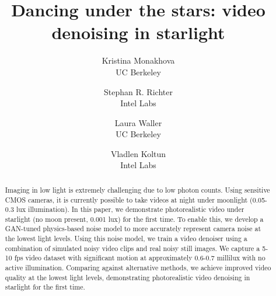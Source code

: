 \documentclass[final]{cvpr}
\begin{document}
\title{Dancing under the stars: video denoising in starlight}


\author{Kristina Monakhova\\
UC Berkeley\\
\and
Stephan R. Richter\\
Intel Labs \\
\and
Laura Waller\\
UC Berkeley \\
\and
Vladlen Koltun\\
Intel Labs \\
}

\makeatletter
\g@addto@macro{}
\makeatother

\maketitle
\thispagestyle{empty}


\begin{abstract}
Imaging in low light is extremely challenging due to low photon counts. Using sensitive CMOS cameras, it is currently possible to take videos at night under moonlight (0.05-0.3 lux illumination). In this paper, we demonstrate photorealistic video under starlight (no moon present, 0.001 lux) for the first time. To enable this, we develop a GAN-tuned physics-based noise model to more accurately represent camera noise at the lowest light levels. Using this noise model, we train a video denoiser using a combination of simulated noisy video clips and real noisy still images. We capture a 5-10 fps video dataset with significant motion at approximately 0.6-0.7 millilux with no active illumination.  Comparing against alternative methods, we achieve improved video quality at the lowest light levels, demonstrating  photorealistic video denoising in starlight for the first time. 
\vspace{-4mm}
\end{abstract}
\end{document}
